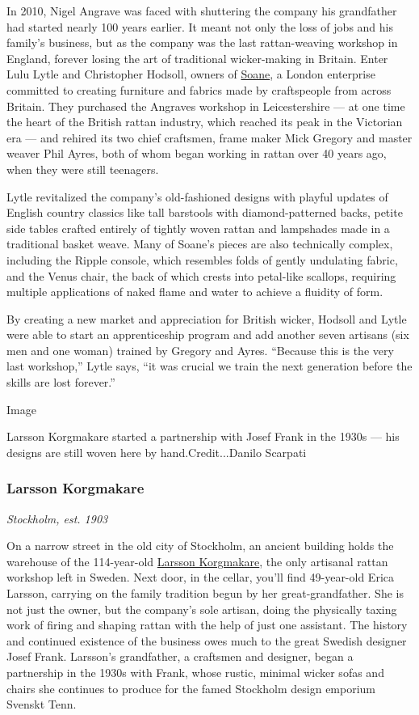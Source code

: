 In 2010, Nigel Angrave was faced with shuttering the company his
grandfather had started nearly 100 years earlier. It meant not only the
loss of jobs and his family's business, but as the company was the last
rattan-weaving workshop in England, forever losing the art of
traditional wicker-making in Britain. Enter Lulu Lytle and Christopher
Hodsoll, owners of \href{http://www.soane.co.uk/}{Soane}, a London
enterprise committed to creating furniture and fabrics made by
craftspeople from across Britain. They purchased the Angraves workshop
in Leicestershire --- at one time the heart of the British rattan
industry, which reached its peak in the Victorian era --- and rehired
its two chief craftsmen, frame maker Mick Gregory and master weaver Phil
Ayres, both of whom began working in rattan over 40 years ago, when they
were still teenagers.

Lytle revitalized the company's old-fashioned designs with playful
updates of English country classics like tall barstools with
diamond-patterned backs, petite side tables crafted entirely of tightly
woven rattan and lampshades made in a traditional basket weave. Many of
Soane's pieces are also technically complex, including the Ripple
console, which resembles folds of gently undulating fabric, and the
Venus chair, the back of which crests into petal-like scallops,
requiring multiple applications of naked flame and water to achieve a
fluidity of form.

By creating a new market and appreciation for British wicker, Hodsoll
and Lytle were able to start an apprenticeship program and add another
seven artisans (six men and one woman) trained by Gregory and Ayres.
``Because this is the very last workshop,'' Lytle says, ``it was crucial
we train the next generation before the skills are lost forever.''

Image

Larsson Korgmakare started a partnership with Josef Frank in the 1930s
--- his designs are still woven here by hand.Credit...Danilo Scarpati

\hypertarget{larsson-korgmakare}{%
\subsubsection{Larsson Korgmakare}\label{larsson-korgmakare}}

\emph{Stockholm, est. 1903}

On a narrow street in the old city of Stockholm, an ancient building
holds the warehouse of the 114-year-old
\href{http://www.larssonkorgmakare.se/}{Larsson Korgmakare}, the only
artisanal rattan workshop left in Sweden. Next door, in the cellar,
you'll find 49-year-old Erica Larsson, carrying on the family tradition
begun by her great-grandfather. She is not just the owner, but the
company's sole artisan, doing the physically taxing work of firing and
shaping rattan with the help of just one assistant. The history and
continued existence of the business owes much to the great Swedish
designer Josef Frank. Larsson's grandfather, a craftsmen and designer,
began a partnership in the 1930s with Frank, whose rustic, minimal
wicker sofas and chairs she continues to produce for the famed Stockholm
design emporium Svenskt Tenn.

